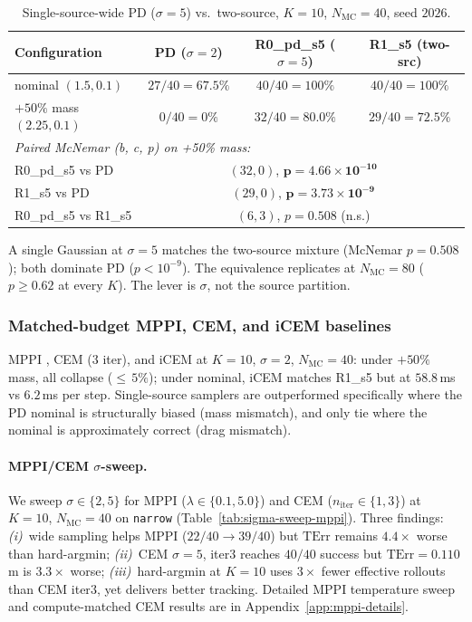 \documentclass[11pt,onecolumn,a4paper]{article}
\newcommand{\Nm}{N_{\mathrm{MC}}}
\newcommand{\TErr}{\mathrm{TErr}}
\begin{document}
\begin{table}[t]
\centering
\caption{Single-source-wide PD ($\sigma = 5$) vs.\ two-source, $K = 10$, $\Nm = 40$, seed
$2026$.}\label{tab:r0-vs-r1}
\begin{tabular}{lccc}
\toprule
Configuration & PD ($\sigma=2$) & R0\_pd\_s5 ($\sigma=5$) & R1\_s5 (two-src) \\
\midrule
nominal $(1.5, 0.1)$ & $27/40 = 67.5\%$ & $40/40 = 100\%$ & $40/40 = 100\%$ \\
$+50\%$ mass $(2.25, 0.1)$ & $0/40 = 0\%$ & $32/40 = 80.0\%$ & $29/40 = 72.5\%$ \\
\midrule
\multicolumn{4}{l}{\emph{Paired McNemar (b, c, p) on +50\% mass:}} \\
R0\_pd\_s5 vs PD & \multicolumn{3}{c}{$(32, 0)$, $\mathbf{p = 4.66\times10^{-10}}$} \\
R1\_s5 vs PD     & \multicolumn{3}{c}{$(29, 0)$, $\mathbf{p = 3.73\times10^{-9}}$} \\
R0\_pd\_s5 vs R1\_s5 & \multicolumn{3}{c}{$(6, 3)$, $p = 0.508$ (n.s.)} \\
\bottomrule
\end{tabular}
\end{table}

A single Gaussian at $\sigma = 5$ matches the two-source mixture
(McNemar $p = 0.508$); both dominate PD ($p < 10^{-9}$). The
equivalence replicates at $\Nm = 80$ ($p \ge 0.62$ at every $K$).
The lever is $\sigma$, not the source partition.

\subsubsection{Matched-budget MPPI, CEM, and iCEM baselines}\label{sec:exp-mppi-cem}

MPPI \cite{WIL17}, CEM \cite{BOT13} (3 iter), and iCEM \cite{PIN20}
at $K = 10$, $\sigma = 2$, $\Nm = 40$: under $+50\%$ mass, all
collapse (${\le}\,5\%$); under nominal, iCEM matches R1\_s5 but at
$58.8\,$ms vs $6.2\,$ms per step. Single-source samplers are
outperformed specifically where the PD nominal is structurally biased
(mass mismatch), and only tie where the nominal is approximately
correct (drag mismatch).

\paragraph{MPPI/CEM $\sigma$-sweep.}\label{sec:exp-sigma-sweep}
We sweep $\sigma \in \{2, 5\}$ for MPPI ($\lambda \in \{0.1, 5.0\}$) and
CEM ($n_{\mathrm{iter}} \in \{1, 3\}$) at $K = 10$, $\Nm = 40$ on
\texttt{narrow} (Table~\ref{tab:sigma-sweep-mppi}). Three findings:
\emph{(i)}~wide sampling helps MPPI ($22/40 \to 39/40$) but
$\TErr$ remains $4.4\times$ worse than hard-argmin;
\emph{(ii)}~CEM $\sigma{=}5$, iter$3$ reaches $40/40$ success but
$\TErr = 0.110\,$m is $3.3\times$ worse;
\emph{(iii)}~hard-argmin at $K = 10$ uses $3\times$ fewer effective
rollouts than CEM iter$3$, yet delivers better tracking.
Detailed MPPI temperature sweep and compute-matched CEM results are in
Appendix~\ref{app:mppi-details}.
\end{document}

